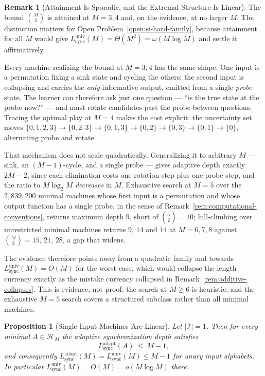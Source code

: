 \documentclass[12pt]{article}
\newtheorem{proposition}[theorem]{Proposition}
\theoremstyle{definition}
\newtheorem{remark}[theorem]{Remark}
\newcommand{\Lsync}{L_{\mathrm{sync}}^{\mathrm{adapt}}}
\newcommand{\Lsyncu}{L_{\mathrm{sync}}^{\mathrm{univ}}}
\begin{document}
\begin{remark}[Attainment Is Sporadic, and the Extremal Structure Is Linear]
\label{rem:attainment-sporadic}
The bound $\binom{M}{2}$ is attained at $M=3,4$ and, on the evidence, at no
larger $M$.  The distinction matters for
Open Problem~\ref{open:si-hard-family}, because attainment for all $M$ would
give $\Lsyncu(M)=\Theta(M^2)=\omega(M\log M)$ and settle it affirmatively.

Every machine realizing the bound at $M=3,4$ has the same shape.  One input is
a permutation fixing a sink state and cycling the others; the second input is
collapsing and carries the \emph{only} informative output, emitted from a
single \emph{probe} state.  The learner can therefore ask just one question ---
``is the true state at the probe now?'' --- and must rotate candidates past the
probe between questions.  Tracing the optimal play at $M=4$ makes the cost
explicit: the uncertainty set moves
$\{0,1,2,3\}\to\{0,2,3\}\to\{0,1,3\}\to\{0,2\}\to\{0,3\}\to\{0,1\}\to\{0\}$,
alternating probe and rotate.

That mechanism does not scale quadratically.  Generalizing it to arbitrary $M$
--- sink, an $(M-1)$-cycle, and a single probe --- gives adaptive depth exactly
$2M-2$, since each elimination costs one rotation step plus one probe step, and
the ratio to $M\log_2M$ \emph{decreases} in $M$.  Exhaustive search at $M=5$
over the $2{,}839{,}200$ minimal machines whose first input is a permutation
and whose output function has a single probe, in the sense of
Remark~\ref{rem:computational-conventions}, returns maximum depth $9$, short
of $\binom{5}{2}=10$; hill-climbing over unrestricted minimal machines returns
$9$, $14$ and $14$ at $M=6,7,8$ against $\binom{M}{2}=15$, $21$, $28$, a gap
that widens.

The evidence therefore points away from a quadratic family and towards
$\Lsyncu(M)=O(M)$ for the worst case, which would collapse the length currency
exactly as the mistake currency collapsed in
Remark~\ref{rem:additive-collapses}.  This is evidence, not proof: the search
at $M\ge6$ is heuristic, and the exhaustive $M=5$ search covers a structured
subclass rather than all minimal machines.
\end{remark}

\begin{proposition}[Single-Input Machines Are Linear]
\label{prop:lsyncu-single-input}
Let $|\mathcal I|=1$.  Then for every minimal $A\in\mathcal H_M$ the adaptive
synchronization depth satisfies
\[
L_{\mathrm{sync}}^{\mathrm{adapt}}(A)\ \le\ M-1 ,
\]
and consequently $\Lsync(M)=\Lsyncu(M)\le M-1$ for unary input alphabets.  In
particular $\Lsyncu(M)=O(M)=o(M\log M)$ there.
\end{proposition}
\end{document}
